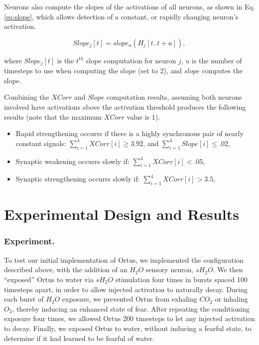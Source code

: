 \documentclass[letterpaper]{article}
\begin{document}
Neurons also compute the slopes of the activations of all neurons, as shown in Eq. \ref{eq:slope}, which allows detection of a constant, or rapidly changing neuron's activation.



\begin{equation}
    \label{eq:slope}
    Slope_j[t] =  slope_u(H_{j}[t..t+u]),
\end{equation}

where $Slope_j[t]$ is the $t^{th}$ slope computation for neuron $j$, $u$ is the number of timesteps to use when computing the slope (set to 2), and $slope$ computes the slope.

Combining the $XCorr$ and $Slope$ computation results, assuming both neurons involved have activations above the activation threshold produces the following results (note that the maximum $XCorr$ value is 1).

\begin{itemize}
    \itemsep0em
    \item Rapid strengthening occurrs if there is a highly synchronous pair of nearly constant signals:
        \subitem $\sum_{i=1}^{4}{ XCorr[i]} \ge 3.92$, and
        \subitem $\sum_{i=1}^{4}{ Slope[i]} \le .02$,
    \item Synaptic weakening occurrs slowly if:
        \subitem $\sum_{i=1}^{4}{ XCorr[i]} < .05$,
    \item Synaptic strengthening occurrs slowly if:
        \subitem $\sum_{i=1}^{4}{ XCorr[i]} > 3.5$,
\end{itemize}

\section{Experimental Design and Results}

\subsubsection{Experiment.} To test our initial implementation of Ortus, we implemented the configuration described above, with the addition of an $H_2O$ sensory neuron, $sH_2O$.
We then ``exposed'' Ortus to water via $sH_2O$ stimulation four times in bursts spaced 100 timesteps apart, in order to allow injected activation to naturally decay.
During each burst of $H_2O$ exposure, we prevented Ortus from exhaling $CO_2$ or inhaling $O_2$, thereby inducing an enhanced state of fear.
After repeating the conditioning exposure four times, we allowed Ortus 200 timesteps to let any injected activation to decay.
Finally, we exposed Ortus to water, without inducing a fearful state, to determine if it had learned to be fearful of water.
\end{document}
